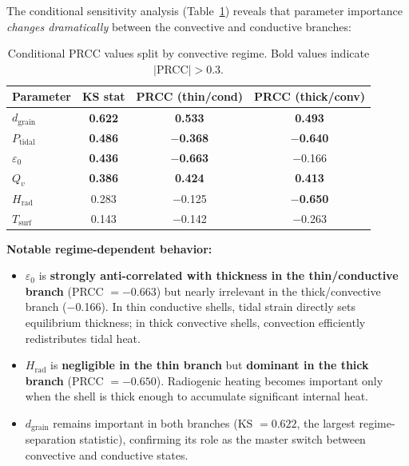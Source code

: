 \documentclass[11pt,letterpaper]{article}
\begin{document}
The conditional sensitivity analysis (Table~\ref{tab:conditional}) reveals that parameter importance \textit{changes dramatically} between the convective and conductive branches:

\begin{table}[htbp]
\centering
\caption{Conditional PRCC values split by convective regime. Bold values indicate $|$PRCC$| > 0.3$.}
\label{tab:conditional}
\begin{tabular}{@{}lccc@{}}
\toprule
\textbf{Parameter} & \textbf{KS stat} & \textbf{PRCC (thin/cond)} & \textbf{PRCC (thick/conv)} \\
\midrule
$d_\mathrm{grain}$ & \textbf{0.622} & \textbf{0.533} & \textbf{0.493} \\
$P_\mathrm{tidal}$ & \textbf{0.486} & \textbf{$-$0.368} & \textbf{$-$0.640} \\
$\varepsilon_0$ & \textbf{0.436} & \textbf{$-$0.663} & $-$0.166 \\
$Q_v$ & \textbf{0.386} & \textbf{0.424} & \textbf{0.413} \\
$H_\mathrm{rad}$ & 0.283 & $-$0.125 & \textbf{$-$0.650} \\
$T_\mathrm{surf}$ & 0.143 & $-$0.142 & $-$0.263 \\
\bottomrule
\end{tabular}
\end{table}

\textbf{Notable regime-dependent behavior:}
\begin{itemize}[nosep]
  \item $\varepsilon_0$ is \textbf{strongly anti-correlated with thickness in the thin/conductive branch} (PRCC $= -0.663$) but nearly irrelevant in the thick/convective branch ($-$0.166). In thin conductive shells, tidal strain directly sets equilibrium thickness; in thick convective shells, convection efficiently redistributes tidal heat.
  \item $H_\mathrm{rad}$ is \textbf{negligible in the thin branch} but \textbf{dominant in the thick branch} (PRCC $= -0.650$). Radiogenic heating becomes important only when the shell is thick enough to accumulate significant internal heat.
  \item $d_\mathrm{grain}$ remains important in both branches (KS $= 0.622$, the largest regime-separation statistic), confirming its role as the master switch between convective and conductive states.
\end{itemize}


\end{document}
